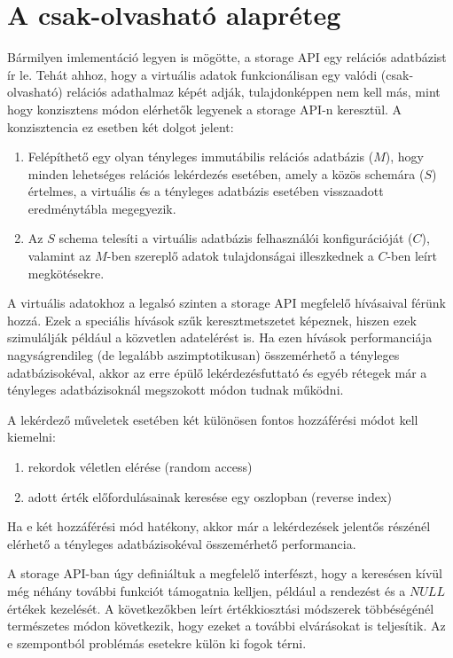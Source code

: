 \documentclass[
    parspace, %
    noindent, %
]{elteiktdk}[2023/10/30]
\begin{document}

\section{A csak-olvasható alapréteg}

Bármilyen imlementáció legyen is mögötte, a storage API egy relációs adatbázist ír le.
Tehát ahhoz, hogy a virtuális adatok funkcionálisan egy valódi (csak-olvasható) relációs adathalmaz képét adják,
tulajdonképpen nem kell más, mint hogy konzisztens módon elérhetők legyenek a storage API-n keresztül.
A konzisztencia ez esetben két dolgot jelent:

\begin{enumerate}
  \item Felépíthető egy olyan tényleges immutábilis relációs adatbázis ($M$),
        hogy minden lehetséges relációs lekérdezés esetében, amely a közös schemára ($S$) értelmes,
        a virtuális és a tényleges adatbázis esetében visszaadott eredménytábla megegyezik.
  \item Az $S$ schema telesíti a virtuális adatbázis felhasználói konfigurációját ($C$),
        valamint az $M$-ben szereplő adatok tulajdonságai illeszkednek a $C$-ben leírt megkötésekre.
\end{enumerate}

A virtuális adatokhoz a legalsó szinten a storage API megfelelő hívásaival férünk hozzá.
Ezek a speciális hívások szűk keresztmetszetet képeznek,
hiszen ezek szimulálják például a közvetlen adatelérést is.
Ha ezen hívások performanciája nagyságrendileg (de legalább aszimptotikusan) összemérhető a tényleges adatbázisokéval,
akkor az erre épülő lekérdezésfuttató és egyéb rétegek már a tényleges adatbázisoknál megszokott módon tudnak működni.

A lekérdező műveletek esetében két különösen fontos hozzáférési módot kell kiemelni:

\begin{enumerate}
  \item rekordok véletlen elérése (random access)
  \item adott érték előfordulásainak keresése egy oszlopban (reverse index)
\end{enumerate}

Ha e két hozzáférési mód hatékony, akkor már a lekérdezések jelentős részénél
elérhető a tényleges adatbázisokéval összemérhető performancia.

A storage API-ban úgy definiáltuk a megfelelő interfészt,
hogy a keresésen kívül még néhány további funkciót támogatnia kelljen,
például a rendezést és a $NULL$ értékek kezelését.
A következőkben leírt értékkiosztási módszerek többéségénél természetes módon következik,
hogy ezeket a további elvárásokat is teljesítik.
Az e szempontból problémás esetekre külön ki fogok térni.
\end{document}
